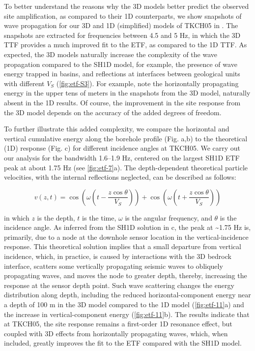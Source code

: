 To better understand the reasons why the 3D models better predict the observed site amplification, as compared to their 1D counterparts, we show snapshots of wave propagation for our 3D and 1D (simplified) models of TKCH05 in . The snapshots are extracted for frequencies between 4.5 and 5 Hz, in which the 3D TTF provides a much improved fit to the ETF, as compared to the 1D TTF. As expected, the 3D models naturally increase the complexity of the wave propagation compared to the SH1D model, for example, the presence of wave energy trapped in basins, and reflections at interfaces between geological units with different $V_S$ (\cref{fig:etf-S3}). For example, note the horizontally propagating energy in the upper tens of meters in the snapshots from the 3D model, naturally absent in the 1D results. Of course, the improvement in the site response from the 3D model depends on the accuracy of the added degrees of freedom.

To further illustrate this added complexity, we compare the horizontal and vertical cumulative energy along the borehole profile (Fig. a,b) to the theoretical (1D) response (Fig. c) for different incidence angles at TKCH05. We carry out our analysis for the bandwidth 1.6–1.9 Hz, centered on the largest SH1D ETF peak at about 1.75 Hz (see  \cref{fig:etf-7}a). The depth-dependent theoretical particle velocities, with the internal reflections neglected, can be described as follows:

\begin{equation}\label{eq:etf-6}
  v(z, t)=\cos \left(\omega\left(t-\frac{z \cos \theta}{V_{S}}\right)\right)+\cos \left(\omega\left(t+\frac{z \cos \theta}{V_{S}}\right)\right)
\end{equation}

\noindent in which $z$ is the depth, $t$ is the time, $\omega$ is the angular frequency, and $\theta$ is the incidence angle. As inferred from the SH1D solution in c, the peak at \textasciitilde 1.75 Hz is, primarily, due to a node at the downhole sensor location in the vertical-incidence response. This theoretical solution implies that a small departure from vertical incidence, which, in practice, is caused by interactions with the 3D bedrock interface, scatters some vertically propagating seismic waves to obliquely propagating waves, and moves the node to greater depth, thereby, increasing the response at the sensor depth point. Such wave scattering changes the energy distribution along depth, including the reduced horizontal-component energy near a depth of 100 m in the 3D model compared to the 1D model (\cref{fig:etf-11}a) and the increase in vertical-component energy (\cref{fig:etf-11}b). The results indicate that at TKCH05, the site response remains a first-order 1D resonance effect, but coupled with 3D effects from horizontally propagating waves, which, when included, greatly improves the fit to the ETF compared with the SH1D model.

